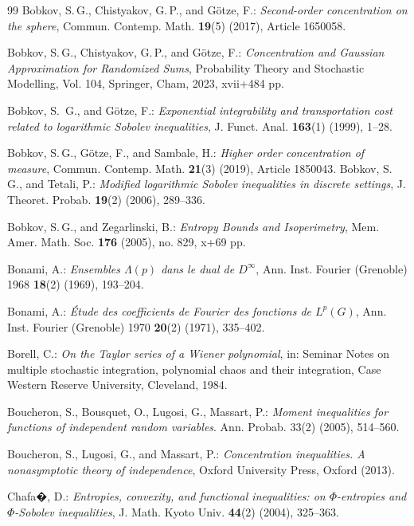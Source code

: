 \documentclass[a4paper,12pt]{amsart}
\numberwithin{equation}{section}
\theoremstyle{remark}
\begin{document}
\begin{thebibliography}{99}
	 Bobkov, S.\,G., Chistyakov, G.\,P., and G\"{o}tze, F.: \emph{Second-order concentration on the sphere}, Commun. Contemp. Math. \textbf{19}(5) (2017), Article 1650058.
	
	 Bobkov, S.\,G., Chistyakov, G.\,P., and G\"{o}tze, F.: \emph{Concentration and Gaussian Approximation for Randomized Sums}, Probability Theory and Stochastic Modelling, Vol. 104, Springer, Cham, 2023, xvii+484 pp.
	
	 Bobkov, S.\, G., and G{\"o}tze, F.: \emph{Exponential integrability and transportation cost related to logarithmic {S}obolev inequalities}, J. Funct. Anal. \textbf{163}(1) (1999), 1--28.
	
	 Bobkov, S.\,G., G\"{o}tze, F., and Sambale, H.: \emph{Higher order concentration of measure}, Commun. Contemp. Math. \textbf{21}(3) (2019), Article 1850043.
%	
	 Bobkov, S.\,G., and Tetali, P.: \emph{Modified logarithmic {S}obolev inequalities in
	discrete settings}, J. Theoret. Probab. \textbf{19}(2) (2006), 289--336.
	
	 Bobkov, S.\,G., and Zegarlinski, B.: \emph{Entropy Bounds and Isoperimetry}, Mem. Amer. Math. Soc. \textbf{176} (2005), no. 829, x+69 pp.
	
	 Bonami, A.: \emph{Ensembles $\Lambda(p)$ dans le dual de $D^{\infty }$}, Ann. Inst. Fourier (Grenoble) 1968 \textbf{18}(2) (1969), 193--204.
	
	 Bonami, A.: \emph{\'{E}tude des coefficients de Fourier des fonctions de $L^{p}(G)$}, Ann. Inst. Fourier (Grenoble) 1970 \textbf{20}(2) (1971), 335--402.
	
	 Borell, C.: \emph{On the Taylor series of a Wiener polynomial}, in: Seminar Notes on multiple stochastic integration, polynomial chaos and their integration, Case Western Reserve University, Cleveland, 1984. 
	
	 Boucheron, S., Bousquet, O., Lugosi, G., Massart, P.: \emph{Moment inequalities for functions of independent random variables}. Ann. Probab. 33(2) (2005), 514--560.
	
	 Boucheron, S., Lugosi, G., and Massart, P.: \emph{Concentration inequalities. A nonasymptotic theory of independence}, Oxford University Press, Oxford (2013).
	
	 Chafa�, D.: \emph{Entropies, convexity, and functional inequalities: on $\Phi$-entropies and $\Phi$-Sobolev inequalities}, J. Math. Kyoto Univ. \textbf{44}(2) (2004), 325--363.
	

\end{thebibliography}
\end{document}
